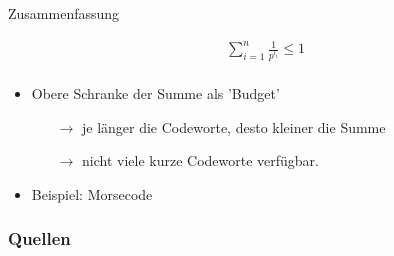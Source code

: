 \documentclass{beamer}
\begin{document}
\begin{frame}{Zusammenfassung}
\begin{minipage}{0.39\textwidth}
\begin{align*}
& \sum_{i=1}^{n} \frac{1}{p^{l_{i}}} \leq 1\\
\end{align*}
\end{minipage}\pause
\hfill
\begin{minipage}{0.6\textwidth}
\begin{itemize}
\item Obere Schranke der Summe als 'Budget'\pause
\begin{itemize}
\item[$\rightarrow$] je länger die Codeworte, desto kleiner die Summe\pause
\item[$\rightarrow$] nicht viele kurze Codeworte verfügbar.\pause
\end{itemize}
\item Beispiel: Morsecode
\end{itemize}

\end{minipage}

\end{frame}
\begin{frame}[allowframebreaks]
        \frametitle{Quellen}

        
\end{frame}
\end{document}

